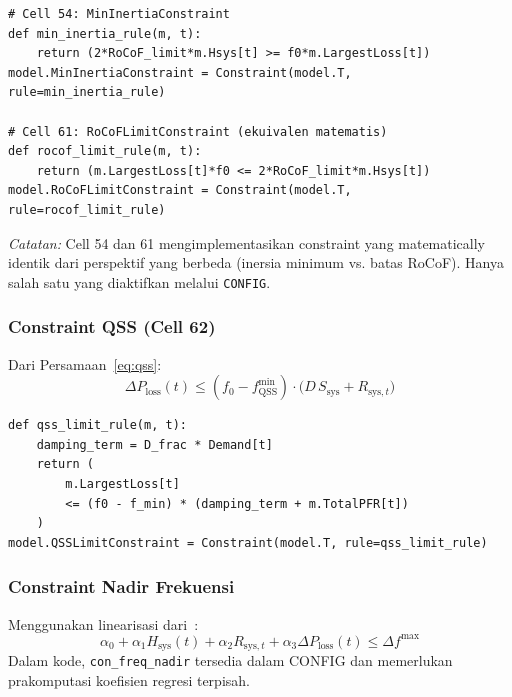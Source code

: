 \documentclass[journal]{IEEEtran}
\newcommand{\Hsys}{H_{\mathrm{sys}}}
\newcommand{\Ploss}{\Delta P_{\mathrm{loss}}}
\begin{document}
\begin{lstlisting}[style=pycode,caption={Constraint RoCoF (Cell 54 dan 61)}]
# Cell 54: MinInertiaConstraint
def min_inertia_rule(m, t):
    return (2*RoCoF_limit*m.Hsys[t] >= f0*m.LargestLoss[t])
model.MinInertiaConstraint = Constraint(model.T, rule=min_inertia_rule)

# Cell 61: RoCoFLimitConstraint (ekuivalen matematis)
def rocof_limit_rule(m, t):
    return (m.LargestLoss[t]*f0 <= 2*RoCoF_limit*m.Hsys[t])
model.RoCoFLimitConstraint = Constraint(model.T, rule=rocof_limit_rule)
\end{lstlisting}

\textit{Catatan:} Cell 54 dan 61 mengimplementasikan
constraint yang matematically identik dari perspektif
yang berbeda (inersia minimum vs. batas RoCoF).
Hanya salah satu yang diaktifkan melalui \texttt{CONFIG}.

\subsubsection{Constraint QSS (Cell 62)}

Dari Persamaan~\eqref{eq:qss}:
\begin{equation}
  \Ploss(t) \leq
    (f_0 - f_{\mathrm{QSS}}^{\min})
    \cdot \Big(D\,S_{\mathrm{sys}} + R_{\mathrm{sys},t}\Big)
  \label{eq:qss_con}
\end{equation}

\begin{lstlisting}[style=pycode,caption={Constraint QSS (Cell 62)}]
def qss_limit_rule(m, t):
    damping_term = D_frac * Demand[t]
    return (
        m.LargestLoss[t]
        <= (f0 - f_min) * (damping_term + m.TotalPFR[t])
    )
model.QSSLimitConstraint = Constraint(model.T, rule=qss_limit_rule)
\end{lstlisting}

\subsubsection{Constraint Nadir Frekuensi}

Menggunakan linearisasi dari~\cite{Shi2025}:
\begin{equation}
  \alpha_0 + \alpha_1 \Hsys(t) + \alpha_2 R_{\mathrm{sys},t}
  + \alpha_3 \Ploss(t) \leq \Delta f^{\max}
  \label{eq:nadir_con}
\end{equation}
Dalam kode, \texttt{con\_freq\_nadir} tersedia dalam CONFIG
dan memerlukan prakomputasi koefisien regresi terpisah.
\end{document}
